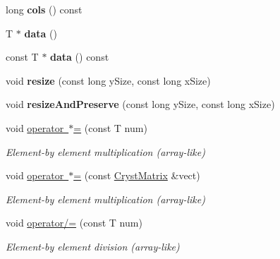 \begin{DoxyCompactItemize}
\item 
\mbox{\label{class_cryst_matrix_a7c52b2e4a6e4273100c42ece761b5f4a}} 
long {\bfseries cols} () const
\item 
\mbox{\label{class_cryst_matrix_a6392f5c3083a9fb59ae2bce15eef8df6}} 
T $\ast$ {\bfseries data} ()
\item 
\mbox{\label{class_cryst_matrix_a24545a0bf74645450031f8274fca48d8}} 
const T $\ast$ {\bfseries data} () const
\item 
\mbox{\label{class_cryst_matrix_a8101d474998f112760f93583ace9428d}} 
void {\bfseries resize} (const long y\+Size, const long x\+Size)
\item 
\mbox{\label{class_cryst_matrix_a974a4a41cb958343c8f5705d1c517678}} 
void {\bfseries resize\+And\+Preserve} (const long y\+Size, const long x\+Size)
\item 
\mbox{\label{class_cryst_matrix_a29083669e14d32541664cfe1db456a0b}} 
void \mbox{\hyperlink{class_cryst_matrix_a29083669e14d32541664cfe1db456a0b}{operator $\ast$=}} (const T num)
\begin{DoxyCompactList}\small\item\em Element-\/by element multiplication (array-\/like) \end{DoxyCompactList}\item 
\mbox{\label{class_cryst_matrix_a5bd288b2174b5d7d0c46200507c02bcf}} 
void \mbox{\hyperlink{class_cryst_matrix_a5bd288b2174b5d7d0c46200507c02bcf}{operator $\ast$=}} (const \mbox{\hyperlink{class_cryst_matrix}{Cryst\+Matrix}} \&vect)
\begin{DoxyCompactList}\small\item\em Element-\/by element multiplication (array-\/like) \end{DoxyCompactList}\item 
\mbox{\label{class_cryst_matrix_a56176f2c83e397dcc5ec5b97d0c49422}} 
void \mbox{\hyperlink{class_cryst_matrix_a56176f2c83e397dcc5ec5b97d0c49422}{operator/=}} (const T num)
\begin{DoxyCompactList}\small\item\em Element-\/by element division (array-\/like) \end{DoxyCompactList}\item 

\end{DoxyCompactItemize}
